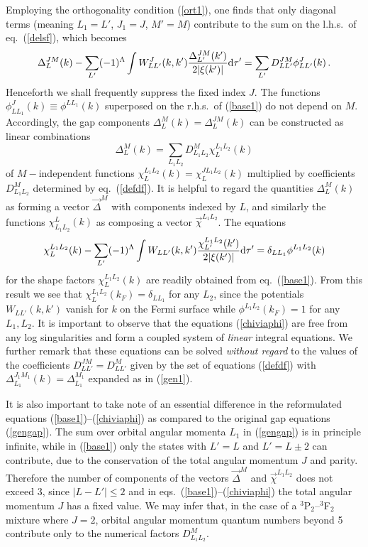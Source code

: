Employing the orthogonality condition (\ref{ort1}), one finds
that only diagonal terms (meaning $L_1=L'$, $J_1=J$, $M'=M$)
contribute to the sum on the l.h.s.\ of eq.~(\ref{delsf}), which
becomes
\begin{equation}
\Delta_L^{JM}(k) - \sum_{L'} (-1)^\Lambda \int
W_{LL'}^J(k,k')\frac{\Delta_{L'}^{JM}(k') } {2|\xi(k')|}{\rm d}
\tau'= \sum_{L'} D_{LL'}^{JM}\phi_{LL'}^J(k) \,.
\label{base1}
\end{equation}
Henceforth we shall frequently suppress the fixed index $J$. The
functions $\phi_{LL_1}^J(k)\equiv \phi^{LL_1}(k)$ superposed on
the r.h.s.\ of (\ref{base1}) do not depend on $M$.  Accordingly,
the gap components $\Delta_L^M(k)=\Delta_L^{JM}(k)$ can be constructed
as linear combinations
\begin{equation}
\Delta^M_L(k)=\sum_{L_1L_2} D^M_{L_1L_2}\chi^{L_1L_2}_L(k)
\label{gen1}
\end{equation}
of $M-$independent functions $ \chi^{L_1L_2}_L(k)= 
\chi^{JL_1L_2}_L(k)$ multiplied by
coefficients $D^M_{L_1L_2}$ determined by eq.~(\ref{defdf}).
It is helpful to regard the quantities $\Delta^M_L(k)$ as forming
a vector ${\vec \Delta}^M$ with components indexed by $L$, and
similarly the functions $\chi_{L_1L_2}^L(k)$ as composing a vector
${\vec\chi}^{L_1L_2}$.
The equations
\begin{equation}
\chi^{L_1L_2}_L(k)-\sum_{L'} (-1)^\Lambda \int
W_{LL'} (k,k')\frac{ \chi^{L_1L_2}_{L'}(k') } {2|\xi(k')|}{\rm d} \tau' =
\delta_{LL_1}\phi^{L_1L_2}(k)
\label{chiviaphi}
\end{equation}
for the shape factors $\chi^{L_1L_2}_L(k)$ are readily obtained
from eq.~(\ref{base1}).  From this result we see that
$\chi^{L_1L_2}_L(k_F) = \delta_{LL_1}$ for any $L_2$, since
the potentials $W_{LL'}(k,k')$ vanish for $k$ on the Fermi surface
while $\phi^{L_1L_2}(k_F)=1$ for any $L_1,L_2$. It is important to
observe that the equations (\ref{chiviaphi}) are free from any
log singularities and form a coupled system of {\it linear}
integral equations.  We further remark that these equations
can be solved {\it without regard} to the values of the coefficients
$D_{LL'}^{JM}=D_{LL'}^M$ given by the set of equations (\ref{defdf})
with $\Delta_{L_1}^{J_1M_1}(k)=\Delta_{L_1}^{M_1}$ expanded as
in (\ref{gen1}).

It is also important to take note of an essential difference in 
the reformulated equations (\ref{base1})--(\ref{chiviaphi}) as 
compared to the original gap equations (\ref{gengap}). The sum 
over orbital angular momenta $L_1$ in (\ref{gengap}) is in principle
infinite, while in (\ref{base1}) only the states with $L'=L$ and 
$L'=L\pm 2$ can contribute, due to the conservation of the total 
angular momentum $J$ and parity.  Therefore the number of components 
of the vectors ${\vec\Delta}^M$ and ${\vec\chi}^{L_1L_2}$ does not 
exceed 3, since $|L-L'|\leq 2$ and in eqs.~(\ref{base1})--(\ref{chiviaphi}) 
the total angular momentum $J$ has a fixed value.  We may infer that, 
in the case of a $^3$P$_2$--$^3$F$_2$ mixture where $J=2$, orbital 
angular momentum quantum numbers beyond 5 contribute only to the 
numerical factors $D^M_{L_1L_2}$.

